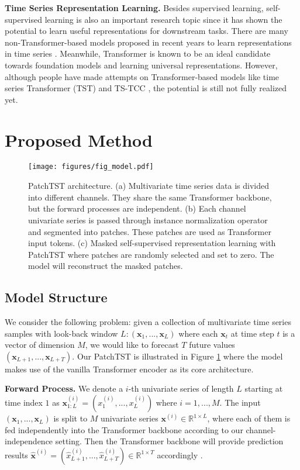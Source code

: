 \documentclass{article} \usepackage{iclr2023_conference,times}
\def\vx{{\bm{x}}}
\newcommand{\R}{\mathbb{R}}
\begin{document}
\textbf{Time Series Representation Learning.} Besides supervised learning, self-supervised learning is also an important research topic since it has shown the potential to learn useful representations for downstream tasks. There are many non-Transformer-based models proposed in recent years to learn representations in time series \citep{representation,tnc,btsf,ts2vec}. Meanwhile, Transformer is known to be an ideal candidate towards foundation models \citep{foundation} and learning universal representations. However, although people have made attempts on Transformer-based models like time series Transformer (TST) \citep{tst} and TS-TCC \citep{ts-tcc}, the potential is still not fully realized yet.

\section{Proposed Method}

\begin{figure}[t]
\begin{center}
\texttt{[image: figures/fig\_model.pdf]}
\end{center}
\caption{PatchTST architecture. (a) Multivariate time series data is divided into different channels. They share the same Transformer backbone, but the forward processes are independent. (b) Each channel univariate series is passed through instance normalization operator and segmented into patches. These patches are used as Transformer input tokens. (c) Masked self-supervised representation learning with PatchTST where patches are randomly selected and set to zero. The model will reconstruct the masked patches. }
\label{fig::patchTST}
\end{figure}

\subsection{Model Structure}
\label{subsec::multi-channel patch transformer}
We consider the following problem: given a collection of multivariate time series samples with look-back window $L:(\vx_1, ..., \vx_L )$ where each $\vx_t$ at time step $t$ is a vector of dimension $M$, we would like to forecast $T$ future values $(\vx_{L+1}, ..., \vx_{L+T})$. Our PatchTST is illustrated in Figure \ref{fig::patchTST} where the model makes use of the vanilla Transformer encoder as its core architecture. 

\textbf{Forward Process.} We denote a $i$-th univariate series of length $L$ starting at time index $1$ as $\vx^{(i)}_{1:L} = (x_1^{(i)},..., x_L^{(i)})$ where $i=1,...,M$. The input $(\vx_1, ..., \vx_L )$ is split to $M$ univariate series $\vx^{(i)} \in \R^{1 \times L}$, where each of them is fed independently into the Transformer backbone according to our channel-independence setting. Then the Transformer backbone will provide prediction results $\hat{\vx}^{(i)}= (\hat{x}^{(i)}_{L+1},..., \hat{x}^{(i)}_{L+T}) \in \R^{1 \times T}$ accordingly .
\end{document}

